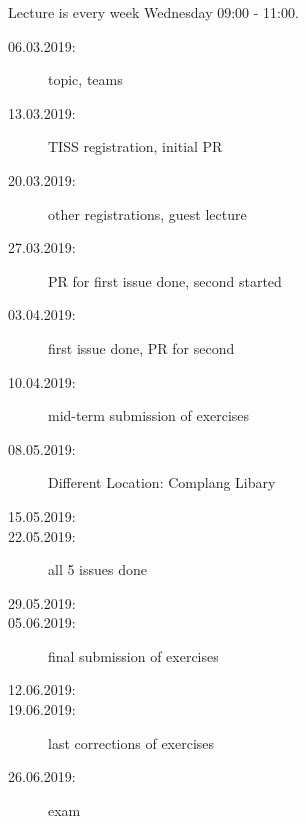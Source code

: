 







\date{08.05.2018}



\renewcommand{\enquote}[1]{\emph{``#1''}} %

\begin{frame}
	\titlepage
	\doclicenseThis
\end{frame}


\begin{frame}
	Lecture is every week Wednesday 09:00 - 11:00.

	\begin{description}
		\item[06.03.2019:] {\color{gray}topic, teams}
		\item[13.03.2019:] {\color{gray}TISS registration, initial PR}
		\item[20.03.2019:] {\color{gray}other registrations, guest lecture}
		\item[27.03.2019:] {\color{gray}PR for first issue done, second started}
		\item[03.04.2019:] {\color{gray}first issue done, PR for second}
		\item[10.04.2019:] {\color{gray}mid-term submission of exercises}
		\item[08.05.2019:] {\color{red}Different Location: Complang Libary}
		\item[15.05.2019:]
		\item[22.05.2019:] all 5 issues done
		\item[29.05.2019:]
		\item[05.06.2019:] final submission of exercises
		\item[12.06.2019:]
		\item[19.06.2019:] last corrections of exercises
		\item[26.06.2019:] exam
	\end{description}
\end{frame}

